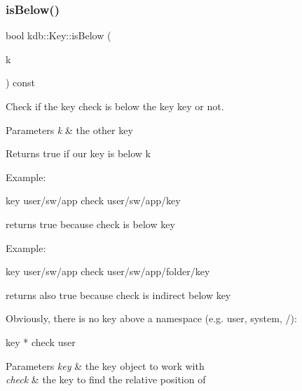 \subsubsection{\texorpdfstring{isBelow()}{isBelow()}}
{\footnotesize\ttfamily bool kdb\+::\+Key\+::is\+Below (\begin{DoxyParamCaption}\item[{const \mbox{\hyperlink{classkdb_1_1Key}{Key}} \&}]{k }\end{DoxyParamCaption}) const\hspace{0.3cm}{\ttfamily [inline]}}



Check if the key check is below the key key or not. 


\begin{DoxyParams}{Parameters}
{\em k} & the other key \\
\hline
\end{DoxyParams}
\begin{DoxyReturn}{Returns}
true if our key is below k
\end{DoxyReturn}
Example\+: \begin{DoxyVerb}key user/sw/app
check user/sw/app/key
\end{DoxyVerb}


returns true because check is below key

Example\+: \begin{DoxyVerb}key user/sw/app
check user/sw/app/folder/key
\end{DoxyVerb}


returns also true because check is indirect below key

Obviously, there is no key above a namespace (e.\+g. user, system, /)\+:

\begin{DoxyVerb}key *
check user
\end{DoxyVerb}



\begin{DoxyParams}{Parameters}
{\em key} & the key object to work with \\
\hline
{\em check} & the key to find the relative position of \\
\hline
\end{DoxyParams}

